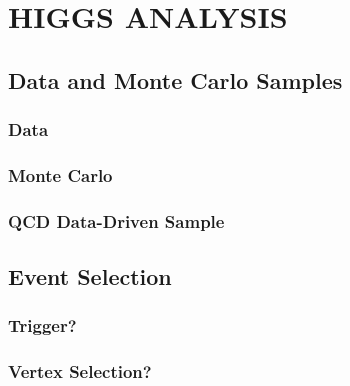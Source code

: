 %
%
%



\chapter{\uppercase {Higgs Analysis}}

\section{Data and Monte Carlo Samples}

\begin{comment}
AN-13-132
=========
Full 2012 (8TeV) CMS dataset \sim19.2 fb-1
Dataset names in table 1
Trigger names
Luminosity uses HF calculation 4.4\% uncertainty [6]


Kreis
=====
Section description

Pedro
=====

\end{comment}

\subsection{Data}
\label{sec:data}
\subsection{Monte Carlo}
\subsection{QCD Data-Driven Sample}

\section{Event Selection}
\subsection{Trigger?}
\subsection{Vertex Selection?}
